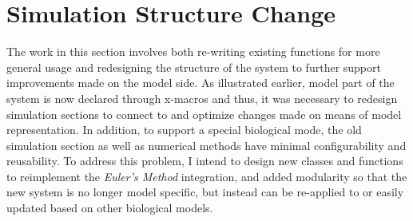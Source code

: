 \documentclass[../thesis.tex]{subfiles}
\begin{document}
\chapter{Simulation Structure Change}
\label{ch:pruning}
The work in this section involves both re-writing existing functions for more general usage and redesigning the structure of the system to further support improvements made on the model side. As illustrated earlier, model part of the system is now declared through x-macros and thus, it was necessary to redesign simulation sections to connect to and optimize changes made on means of model representation. In addition, to support a special biological mode, the old simulation section as well as numerical methods have minimal configurability and reusability. To address this problem, I intend to design new classes and functions to reimplement the \textit{Euler's Method} integration, and added modularity so that the new system is no longer model specific, but instead can be re-applied to or easily updated based on other biological models. 
\end{document}
